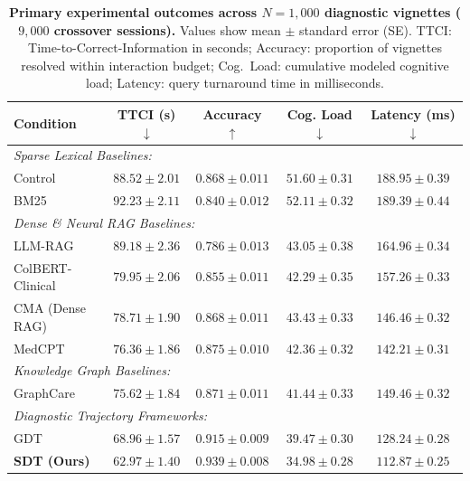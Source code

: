 \documentclass[12pt]{article}
\begin{document}
\vspace{1cm}

\begin{table}[t!]
  \centering
  \caption{\textbf{Primary experimental outcomes across $N=1{,}000$ diagnostic vignettes ($9{,}000$ crossover sessions).} Values show mean $\pm$ standard error (SE). TTCI: Time-to-Correct-Information in seconds; Accuracy: proportion of vignettes resolved within interaction budget; Cog.\ Load: cumulative modeled cognitive load; Latency: query turnaround time in milliseconds.}
  \label{tab:primary_results}
  \small
  \begin{tabular}{@{}lcccc@{}}
    \toprule
    \textbf{Condition} & \textbf{TTCI (s)} $\downarrow$ & \textbf{Accuracy} $\uparrow$ & \textbf{Cog. Load} $\downarrow$ & \textbf{Latency (ms)} $\downarrow$ \\
    \midrule
    \multicolumn{5}{l}{\textit{Sparse Lexical Baselines:}} \\
    Control  & $88.52 \pm 2.01$ & $0.868 \pm 0.011$ & $51.60 \pm 0.31$ & $188.95 \pm 0.39$ \\
    BM25     & $92.23 \pm 2.11$ & $0.840 \pm 0.012$ & $52.11 \pm 0.32$ & $189.39 \pm 0.44$ \\
    \midrule
    \multicolumn{5}{l}{\textit{Dense \& Neural RAG Baselines:}} \\
    LLM-RAG\cite{eickhoff2024ehrrag}  & $89.18 \pm 2.36$ & $0.786 \pm 0.013$ & $43.05 \pm 0.38$ & $164.96 \pm 0.34$ \\
    ColBERT-Clinical\cite{santhanam2022colbertv2} & $79.95 \pm 2.06$ & $0.855 \pm 0.011$ & $42.29 \pm 0.35$ & $157.26 \pm 0.33$ \\
    CMA (Dense RAG)\cite{lewis2020retrieval} & $78.71 \pm 1.90$ & $0.868 \pm 0.011$ & $43.43 \pm 0.33$ & $146.46 \pm 0.32$ \\
    MedCPT\cite{jin2023medcpt}       & $76.36 \pm 1.86$ & $0.875 \pm 0.010$ & $42.36 \pm 0.32$ & $142.21 \pm 0.31$ \\
    \midrule
    \multicolumn{5}{l}{\textit{Knowledge Graph Baselines:}} \\
    GraphCare\cite{jiang2024graphcare} & $75.62 \pm 1.84$ & $0.871 \pm 0.011$ & $41.44 \pm 0.33$ & $149.46 \pm 0.32$ \\
    \midrule
    \multicolumn{5}{l}{\textit{Diagnostic Trajectory Frameworks:}} \\
    GDT      & $68.96 \pm 1.57$ & $0.915 \pm 0.009$ & $39.47 \pm 0.30$ & $128.24 \pm 0.28$ \\
    \textbf{SDT (Ours)} & $\mathbf{62.97 \pm 1.40}$ & $\mathbf{0.939 \pm 0.008}$ & $\mathbf{34.98 \pm 0.28}$ & $\mathbf{112.87 \pm 0.25}$ \\
    \bottomrule
  \end{tabular}
\end{table}
\end{document}
